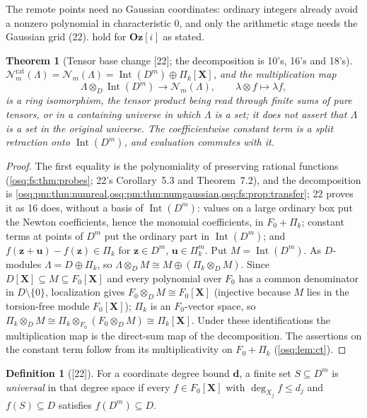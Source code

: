 \documentclass[11pt,letterpaper]{article}
\numberwithin{equation}{section}
\newtheorem{theorem}{Theorem}[section]
\theoremstyle{definition}
\newtheorem{definition}[definition]{Definition}
\theoremstyle{remark}
\theoremstyle{plain}
\newcommand{\Oz}{\mathbf{Oz}}
\newcommand{\GOz}{\Oz[i]}
\newcommand{\Int}{\operatorname{Int}}
\newcommand{\Num}{\mathscr N}
\newcommand{\src}[1]{\textup{\textsf{[#1]}}}
\begin{document}
The remote points need no Gaussian coordinates: ordinary integers already avoid a nonzero polynomial in characteristic $0$, and only the arithmetic
stage needs the Gaussian grid (22).  hold for $\GOz$ as stated.

\begin{theorem}[Tensor base change \src{22}; the decomposition is 10's, 16's and 18's]\label{osq:ft:thm:basechange}
$\Num^{\mathrm{rat}}_m(\Lambda)=\Num_m(\Lambda)=\Int(D^m)\oplus\Pi_k[\mathbf X]$, and the multiplication map
\begin{equation}\label{osq:ft:eq:basechange}
 \Lambda\otimes_D\Int(D^m)\longrightarrow\Num_m(\Lambda),\qquad \lambda\otimes f\longmapsto\lambda f,
\end{equation}
is a ring isomorphism, the tensor product being read through finite sums of pure tensors, or in a containing universe in which $\Lambda$ is a set; it
does not assert that $\Lambda$ is a set in the original universe. The coefficientwise constant term is a split retraction onto $\Int(D^m)$, and
evaluation commutes with it.
\end{theorem}
\begin{proof}
The first equality is the polynomiality of preserving rational functions (\cref{osq:fs:thm:probes}; 22's Corollary~5.3 and Theorem~7.2), and the
decomposition is \cref{osq:pm:thm:numreal,osq:pm:thm:numgaussian,osq:fs:prop:transfer}; 22 proves it as 16 does, without a basis of $\Int(D^m)$: values
on a large ordinary box put the Newton coefficients, hence the monomial coefficients, in $F_0+\Pi_k$; constant terms at points of $D^m$ put the ordinary
part in $\Int(D^m)$; and $f(\mathbf z+\mathbf u)-f(\mathbf z)\in\Pi_k$ for $\mathbf z\in D^m$, $\mathbf u\in\Pi_k^m$. Put $M=\Int(D^m)$. As $D$-modules
$\Lambda=D\oplus\Pi_k$, so $\Lambda\otimes_DM\cong M\oplus(\Pi_k\otimes_DM)$. Since $D[\mathbf X]\subseteq M\subseteq F_0[\mathbf X]$ and every polynomial
over $F_0$ has a common denominator in $D\setminus\{0\}$, localization gives $F_0\otimes_DM\cong F_0[\mathbf X]$ (injective because $M$ lies in the
torsion-free module $F_0[\mathbf X]$); $\Pi_k$ is an $F_0$-vector space, so
$\Pi_k\otimes_DM\cong\Pi_k\otimes_{F_0}(F_0\otimes_DM)\cong\Pi_k[\mathbf X]$. Under these identifications the multiplication map is the direct-sum map
of the decomposition. The assertions on the constant term follow from its multiplicativity on $F_0+\Pi_k$ (\cref{osq:lem:ct}).
\end{proof}

\begin{definition}[\src{22}]\label{osq:ft:def:universal}
For a coordinate degree bound $\mathbf d$, a finite set $S\subseteq D^m$ is \emph{universal} in that degree space if every $f\in F_0[\mathbf X]$ with
$\deg_{X_j}f\le d_j$ and $f(S)\subseteq D$ satisfies $f(D^m)\subseteq D$.
\end{definition}
\end{document}
